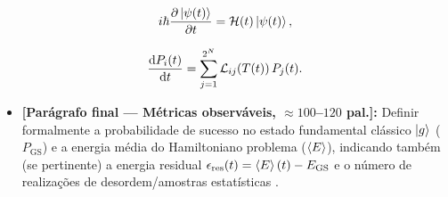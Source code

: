 \documentclass[aps,pre,twocolumn,10pt,superscriptaddress,nofootinbib]{revtex4-2}
\begin{document}
\begin{equation}
  i\hbar \pdv{\ket{\psi(t)}}{t} = \mathcal{H}(t)\ket{\psi(t)},
  \label{eq:dinamica_qa}
\end{equation}

\begin{equation}
  \dv{P_i(t)}{t} = \sum_{j=1}^{2^N} \mathcal{L}_{ij}\!\left(T(t)\right) P_j(t).
  \label{eq:dinamica_sa}
\end{equation}


\begin{itemize}
  \item \textbf{[Parágrafo final --- Métricas observáveis, $\approx 100$--$120$ pal.]:}
        Definir formalmente a probabilidade de sucesso no estado fundamental clássico $\ket{g}$ ($P_{\text{GS}}$) e a energia média do Hamiltoniano problema ($\ev{E}$), indicando também (se pertinente) a energia residual $\epsilon_{\text{res}}(t) = \ev{E}(t) - E_{\text{GS}}$ e o número de realizações de desordem/amostras estatísticas \cite{Kadowaki1998,Das2008}.
\end{itemize}
\end{document}
